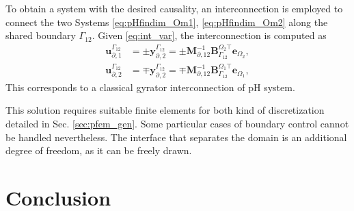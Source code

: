 To obtain a system with the desired causality, an interconnection is employed to connect the two Systems \eqref{eq:pHfindim_Om1}, \eqref{eq:pHfindim_Om2} along the shared boundary $\Gamma_{12}$. Given \eqref{eq:int_var}, the interconnection is computed as
\begin{equation}\label{eq:int_discrvar}
\begin{aligned}
{\mathbf{u}_{\partial, 1}^{\Gamma_{12}}} &= \pm {\mathbf{y}_{\partial, 2}^{\Gamma_{12}}}= \pm \mathbf{M}_{\partial, 12}^{-1} \mathbf{B}_{\Gamma_{12}}^{\Omega_2 \top} \mathbf{e}_{\Omega_2}, \\ {\mathbf{u}_{\partial, 2}^{\Gamma_{12}}} &= \mp {\mathbf{y}_{\partial, 2}^{\Gamma_{12}}}=\mp \mathbf{M}_{\partial, 12}^{-1} \mathbf{B}_{\Gamma_{12}}^{\Omega_1 \top} \mathbf{e}_{\Omega_1}, 
\end{aligned}
\end{equation}
This corresponds to a classical gyrator interconnection of pH system.




This solution requires suitable finite elements for both kind of discretization detailed in Sec. \ref{sec:pfem_gen}. Some particular cases of boundary control cannot be handled nevertheless. The interface that separates the domain is an additional degree of freedom, as it can be freely drawn. 


\section{Conclusion}




